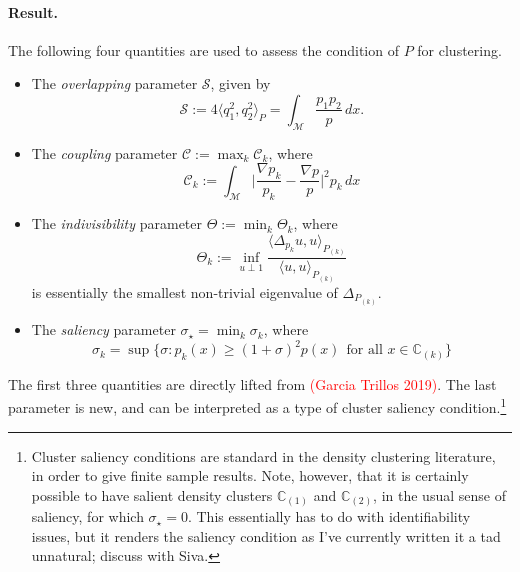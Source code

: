 \documentclass{article}
\newcommand{\1}{\mathbf{1}}
\newcommand{\mc}[1]{\mathcal{#1}}
\newcommand{\mb}[1]{\mathbb{#1}}
\theoremstyle{alden}
\theoremstyle{aldenthm}
\theoremstyle{definition}
\theoremstyle{remark}
\begin{document}
\paragraph{Result.}
The following four quantities are used to assess the condition of $P$ for clustering.
\begin{itemize}
	\item The \emph{overlapping} parameter $\mc{S}$, given by
	\begin{equation*}
	\mc{S} := 4 \langle q_1^2, q_2^2 \rangle_P = \int_{\mc{M}} \frac{p_1 p_2}{p} \,dx.
	\end{equation*}
	\item The \emph{coupling} parameter $\mc{C} := \max_{k} \mc{C}_k$, where
	\begin{equation*}
	\mc{C}_k := \int_{\mc{M}} \biggl| \frac{\nabla p_k}{p_k} - \frac{\nabla p}{p} \biggr|^2 p_k \,dx
	\end{equation*}
	\item The \emph{indivisibility} parameter $\Theta := \min_{k} \Theta_k$, where
	\begin{equation*}
	\Theta_k := \inf_{u \perp 1} \frac{\langle \Delta_{p_{k}}u,u \rangle_{P_{(k)}}}{\langle u,u \rangle_{P_{(k)}}}
	\end{equation*}
	is essentially the smallest non-trivial eigenvalue of $\Delta_{P_{(k)}}$. 
	\item The \emph{saliency} parameter $\sigma_{\star} = \min_{k} \sigma_k$, where
	\begin{equation*}
	\sigma_k = \sup\biggl\{\sigma: p_k(x) \geq (1 + \sigma)^2 p(x)~~\textrm{for all $x \in \mb{C}_{(k)}$} \biggr\}
	\end{equation*}
\end{itemize}
The first three quantities are directly lifted from \textcolor{red}{(Garcia Trillos 2019)}. The last parameter is new, and can be interpreted as a type of cluster saliency condition.\footnote{Cluster saliency conditions are standard in the density clustering literature, in order to give finite sample results. Note, however, that it is certainly possible to have salient density clusters $\mb{C}_{(1)}$ and $\mb{C}_{(2)}$, in the usual sense of saliency, for which $\sigma_{\star} = 0$. This essentially has to do with identifiability issues, but it renders the saliency condition as I've currently written it a tad unnatural; discuss with Siva.}
\end{document}
